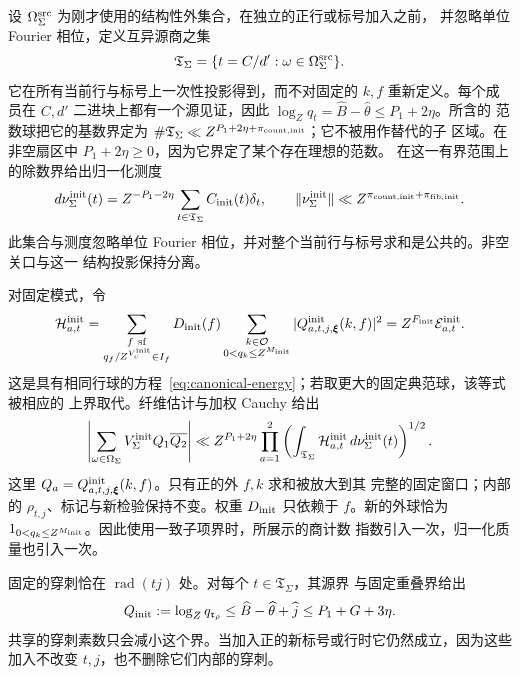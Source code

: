 设 \(\Omega_\Sigma^{\rm src}\) 为刚才使用的结构性外集合，在独立的正行或标号加入之前，
并忽略单位 Fourier 相位，定义互异源商之集
\[
 \mathfrak T_\Sigma=\{t=C/d':\omega\in\Omega_\Sigma^{\rm src}\}.
\]
它在所有当前行与标号上一次性投影得到，而不对固定的 \(k,f\) 重新定义。每个成员在 \(C,d'\)
二进块上都有一个源见证，因此 \(\log_Zq_t=\widehat B-\widehat\theta\le P_1+2\eta\)。所含的
范数球把它的基数界定为
\(\#\mathfrak T_\Sigma\ll Z^{P_1+2\eta+\pi_{{\rm count},{\rm init}}}\)；它不被用作替代的子
区域。在非空扇区中 \(P_1+2\eta\ge0\)，因为它界定了某个存在理想的范数。
在这一有界范围上的除数界给出归一化测度
\begin{equation}\label{eq:initial-normalized-quotients}
 d\nu_\Sigma^{\rm init}(t)
 =Z^{-P_1-2\eta}\sum_{t\in\mathfrak T_\Sigma}C_{\rm init}(t)\delta_t,
 \qquad
 \|\nu_\Sigma^{\rm init}\|
 \ll Z^{\pi_{{\rm count},{\rm init}}+\pi_{{\rm fib},{\rm init}}}.
\end{equation}
此集合与测度忽略单位 Fourier 相位，并对整个当前行与标号求和是公共的。非空关口与这一
结构投影保持分离。

对固定模式，令
\begin{equation}\label{eq:initial-positive-child}
 \mathcal H_{a,t}^{\rm init}
 =\sum_{\substack{f\ {\rm sf}\\q_f/Z^{V_c^{\rm init}}\in I_f}}
 D_{\rm init}(f)\sum_{\substack{k\in\mathcal O\\0<q_k\le Z^{M_{\rm init}}}}
 |Q^{\rm init}_{a,t,j,\boldsymbol\xi}(k,f)|^2
 =Z^{F_{\rm init}}\mathcal E_{a,t}^{\rm init}.
\end{equation}
这是具有相同行球的方程~\eqref{eq:canonical-energy}；若取更大的固定典范球，该等式被相应的
上界取代。纤维估计与加权 Cauchy 给出
\begin{equation}\label{eq:initial-weighted-count}
 \left|\sum_{\omega\in\Omega_\Sigma}V_\Sigma^{\rm init}Q_1\overline{Q_2}\right|
 \ll Z^{P_1+2\eta}
 \prod_{a=1}^2
 \left(\int_{\mathfrak T_\Sigma}\mathcal H_{a,t}^{\rm init}
                         \,d\nu_\Sigma^{\rm init}(t)\right)^{1/2}.
\end{equation}
这里 \(Q_a=Q^{\rm init}_{a,t,j,\boldsymbol\xi}(k,f)\)。只有正的外 \(f,k\) 求和被放大到其
完整的固定窗口；内部的 \(\rho_{t,j}\)、标记与新检验保持不变。权重 \(D_{\rm init}\) 只依赖于
\(f\)。新的外球恰为 \(1_{0<q_k\le Z^{M_{\rm init}}}\)。因此使用一致子项界时，所展示的商计数
指数引入一次，归一化质量也引入一次。

固定的穿刺恰在 \(\operatorname{rad}(tj)\) 处。对每个 \(t\in\mathfrak T_\Sigma\)，其源界
与固定重叠界给出
\begin{equation}\label{old-eq:4.13}
 Q_{\rm init}:=\log_Zq_{\mathfrak r_\rho}
 \le\widehat B-\widehat\theta+\widehat j\le P_1+G+3\eta.
\end{equation}
共享的穿刺素数只会减小这个界。当加入正的新标号或行时它仍然成立，因为这些加入不改变
\(t,j\)，也不删除它们内部的穿刺。

